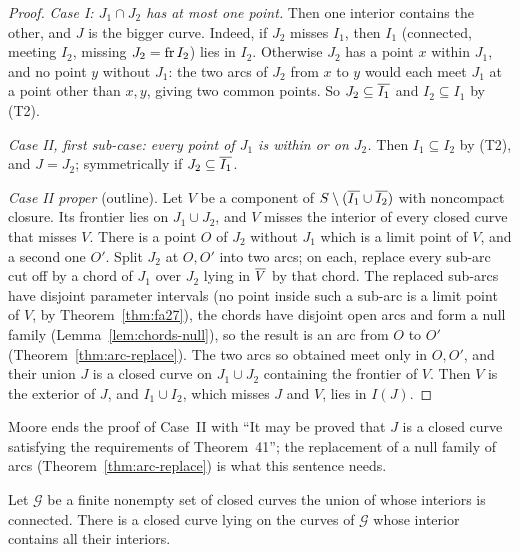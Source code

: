 \begin{proof}
\emph{Case I: $J_1\cap J_2$ has at most one point.} Then one interior contains the other, and $J$ is the bigger curve. Indeed,
if $J_2$ misses $I_1$, then $I_1$ (connected, meeting $I_2$, missing $J_2=\operatorname{fr} I_2$) lies in $I_2$. Otherwise $J_2$ has a point $x$
within $J_1$, and no point $y$ without $J_1$: the two arcs of $J_2$ from $x$ to $y$ would each meet $J_1$ at a point other than
$x,y$, giving two common points. So $J_2\subseteq\overline{I_1}$ and $I_2\subseteq I_1$ by (T2).

\emph{Case II, first sub-case: every point of $J_1$ is within or on $J_2$.} Then $I_1\subseteq I_2$ by (T2), and $J=J_2$;
symmetrically if $J_2\subseteq\overline{I_1}$.

\emph{Case II proper} (outline). Let $V$ be a component of $S\setminus(\overline{I_1}\cup\overline{I_2})$ with noncompact closure. Its frontier lies
on $J_1\cup J_2$, and $V$ misses the interior of every closed curve that misses $V$. There is a point $O$ of $J_2$ without $J_1$ which is
a limit point of $V$, and a second one $O'$. Split $J_2$ at $O,O'$ into two arcs; on each, replace every sub-arc cut off by a chord of $J_1$
over $J_2$ lying in $\overline{V}$ by that chord. The replaced sub-arcs have disjoint parameter intervals (no point inside such a sub-arc is a limit
point of $V$, by Theorem~\ref{thm:fa27}), the chords have disjoint open arcs and form a null family (Lemma~\ref{lem:chords-null}), so the
result is an arc from $O$ to $O'$ (Theorem~\ref{thm:arc-replace}). The two arcs so obtained meet only in $O,O'$, and their union $J$ is a
closed curve on $J_1\cup J_2$ containing the frontier of $V$. Then $V$ is the exterior of $J$, and $I_1\cup I_2$, which misses $J$ and $V$, lies
in $I(J)$.
\end{proof}


Moore ends the proof of Case~II with ``It may be proved that $J$ is a closed curve satisfying the requirements of Theorem~41''; the
replacement of a null family of arcs (Theorem~\ref{thm:arc-replace}) is what this sentence needs.

\begin{theorem}[F.A.\ Theorem~42]\label{thm:fa42}
Let $\mathcal G$ be a finite nonempty set of closed curves the union of whose interiors is connected. There is a closed curve lying on
the curves of $\mathcal G$ whose interior contains all their interiors.
\end{theorem}

